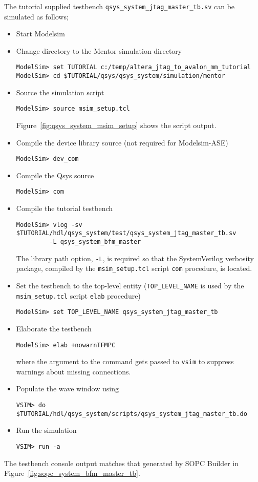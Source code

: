 \documentclass[10pt,twoside]{article}
\begin{document}
The tutorial supplied testbench \verb+qsys_system_jtag_master_tb.sv+
can be simulated as follows;
%
\begin{itemize}
\item Start Modelsim
\item Change directory to the Mentor simulation directory
%
\begin{verbatim}
ModelSim> set TUTORIAL c:/temp/altera_jtag_to_avalon_mm_tutorial
ModelSim> cd $TUTORIAL/qsys/qsys_system/simulation/mentor
\end{verbatim}
%
\item Source the simulation script
%
\begin{verbatim}
ModelSim> source msim_setup.tcl
\end{verbatim}
%
Figure~\ref{fig:qsys_system_msim_setup} shows the script output.
%
\item Compile the device library source (not required for Modelsim-ASE)
%
%
\begin{verbatim}
ModelSim> dev_com
\end{verbatim}
%
\item Compile the Qsys source
%
\begin{verbatim}
ModelSim> com
\end{verbatim}
%
\item Compile the tutorial testbench
%
\begin{verbatim}
ModelSim> vlog -sv $TUTORIAL/hdl/qsys_system/test/qsys_system_jtag_master_tb.sv
         -L qsys_system_bfm_master
\end{verbatim}
%
The library path option, \verb+-L+, is required so that the SystemVerilog
verbosity package, compiled by the \verb+msim_setup.tcl+ script \verb+com+
procedure, is located.
%
\item Set the testbench to the top-level entity 
(\verb+TOP_LEVEL_NAME+ is used by the \verb+msim_setup.tcl+
script \verb+elab+ procedure)
%
\begin{verbatim}
ModelSim> set TOP_LEVEL_NAME qsys_system_jtag_master_tb
\end{verbatim}
%
\item Elaborate the testbench
%
\begin{verbatim}
ModelSim> elab +nowarnTFMPC
\end{verbatim}
%
where the argument to the command gets passed to \verb+vsim+ to
suppress warnings about missing connections.
%
\item Populate the wave window using
%
\begin{verbatim}
VSIM> do $TUTORIAL/hdl/qsys_system/scripts/qsys_system_jtag_master_tb.do
\end{verbatim}
%
\item Run the simulation
%
\begin{verbatim}
VSIM> run -a
\end{verbatim}
%
\end{itemize}
%
The testbench console output matches that generated by 
SOPC Builder in Figure~\ref{fig:sopc_system_bfm_master_tb}.
\end{document}
